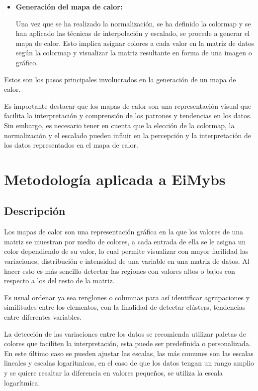 \documentclass{article}
\begin{document}
\begin{itemize}
\begin{itemize}
\item   \textbf{Generación del mapa de calor:}

Una vez que se ha realizado la normalización, se ha definido la colormap y se han aplicado las técnicas de interpolación y escalado, se procede a generar el mapa de calor. Esto implica asignar colores a cada valor en la matriz de datos según la colormap y visualizar la matriz resultante en forma de una imagen o gráfico.
\end{itemize}

Estos son los pasos principales involucrados en la generación de un mapa de calor.
\end{itemize}

Es importante destacar que los mapas de calor son una representación visual que facilita la interpretación y comprensión de los patrones y tendencias en los datos. Sin embargo, es necesario tener en cuenta que la elección de la colormap, la normalización y el escalado pueden influir en la percepción y la interpretación de los datos representados en el mapa de calor.

\section{Metodología aplicada a EiMybs}

\subsection{Descripci\'on}

Los mapas de calor son una representación gráfica en la que  los valores de una matriz se muestran por medio de colores, a cada entrada de ella se le asigna un color dependiendo de su valor, lo cual permite visualizar con mayor facilidad las variaciones, distribución e intensidad de una variable en una matriz de datos. Al hacer esto es más sencillo detectar las regiones con valores altos o bajos con respecto a los del resto de la matriz.


Es usual ordenar ya sea renglones o columnas para así identificar agrupaciones y similitudes entre los elementos, con la finalidad de detectar clústers, tendencias entre diferentes variables.


La detección de las variaciones entre los datos se recomienda utilizar paletas de colores que faciliten la interpretación, esta puede ser predefinida o personalizada. En este último caso se pueden ajustar las escalas, las más comunes son las escalas lineales y escalas logarítmicas, en el caso de que  los datos tengan un rango amplio y se quiere resaltar la diferencia en valores pequeños, se utiliza la escala logarítmica.
\end{document}
